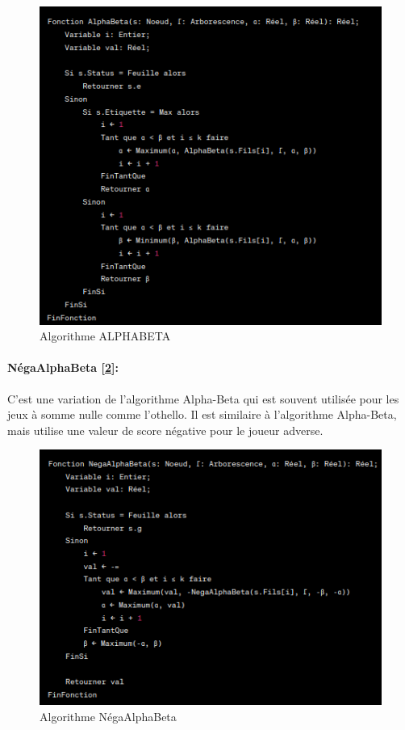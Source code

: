\documentclass[12pt]{article}
\begin{document}
	   
	\begin{figure}[H]
		\centering
		\includegraphics[scale=0.7]{img/alphabeta}
		\caption{Algorithme ALPHABETA }
		\label{Algorithme ALPHABETA}
	\end{figure}
	
	
		
\paragraph{	NégaAlphaBeta [\ref{Algorithme NégaAlphaBeta}]: }C'est une variation de l'algorithme Alpha-Beta qui est souvent utilisée pour les jeux à somme nulle comme l'othello. Il est similaire à l'algorithme Alpha-Beta, mais utilise une valeur de score négative pour le joueur adverse.
	
	
		   
	\begin{figure}[H]
		\centering
		\includegraphics[scale=0.7]{img/negaalphabeta}
		\caption{Algorithme NégaAlphaBeta }
		\label{Algorithme NégaAlphaBeta}
	\end{figure}
	
\end{document}
